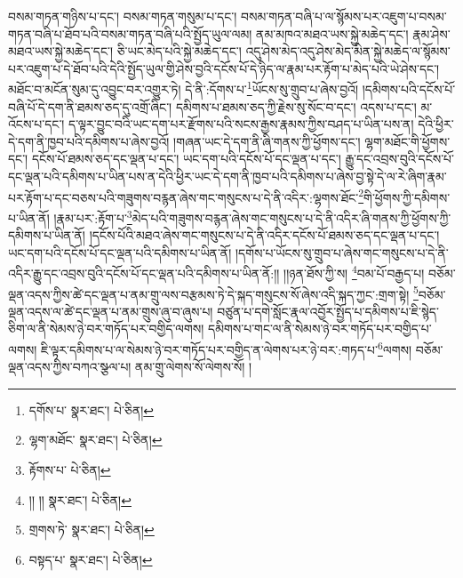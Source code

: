 བསམ་གཏན་གཉིས་པ་དང་། བསམ་གཏན་གསུམ་པ་དང་། བསམ་གཏན་བཞི་པ་ལ་སྙོམས་པར་འཇུག་པ་བསམ་གཏན་བཞི་པ་ཐོབ་པའི་བསམ་གཏན་བཞི་པའི་སྤྱོད་ཡུལ་ལམ། ནམ་མཁའ་མཐའ་ཡས་སྐྱེ་མཆེད་དང་། རྣམ་ཤེས་མཐའ་ཡས་སྐྱེ་མཆེད་དང་། ཅི་ཡང་མེད་པའི་སྐྱེ་མཆེད་དང་། འདུ་ཤེས་མེད་འདུ་ཤེས་མེད་མིན་སྐྱེ་མཆེད་ལ་སྙོམས་པར་འཇུག་པ་དེ་ཐོབ་པའི་དེའི་སྤྱོད་ཡུལ་གྱི་ཤེས་བྱའི་དངོས་པོ་དེ་ཉིད་ལ་རྣམ་པར་རྟོག་པ་མེད་པའི་ཡེ་ཤེས་དང་། མཐོང་བ་མངོན་སུམ་དུ་འབྱུང་བར་འགྱུར་ཏེ། དེ་ནི་:དོགས་པ་\footnote{དགོས་པ་  སྣར་ཐང་།  པེ་ཅིན། }ཡོངས་སུ་གྲུབ་པ་ཞེས་བྱའོ། །དམིགས་པའི་དངོས་པོ་བཞི་པོ་དེ་དག་ནི་ཐམས་ཅད་དུ་འགྲོ་ཞིང་། དམིགས་པ་ཐམས་ཅད་ཀྱི་རྗེས་སུ་སོང་བ་དང་། འདས་པ་དང་། མ་འོངས་པ་དང་། ད་ལྟར་བྱུང་བའི་ཡང་དག་པར་རྫོགས་པའི་སངས་རྒྱས་རྣམས་ཀྱིས་བཤད་པ་ཡིན་པས་ན། དེའི་ཕྱིར་དེ་དག་ནི་ཁྱབ་པའི་དམིགས་པ་ཞེས་བྱའོ། །གཞན་ཡང་དེ་དག་ནི་ཞི་གནས་ཀྱི་ཕྱོགས་དང་། ལྷག་མཐོང་གི་ཕྱོགས་དང་། དངོས་པོ་ཐམས་ཅད་དང་ལྡན་པ་དང་། ཡང་དག་པའི་དངོས་པོ་དང་ལྡན་པ་དང་། རྒྱུ་དང་འབྲས་བུའི་དངོས་པོ་དང་ལྡན་པའི་དམིགས་པ་ཡིན་པས་ན་དེའི་ཕྱིར་ཡང་དེ་དག་ནི་ཁྱབ་པའི་དམིགས་པ་ཞེས་བྱ་སྟེ་དེ་ལ་རེ་ཞིག་རྣམ་པར་རྟོག་པ་དང་བཅས་པའི་གཟུགས་བརྙན་ཞེས་གང་གསུངས་པ་དེ་ནི་འདིར་:ལྷགས་ཐོང་\footnote{ལྷག་མཐོང་  སྣར་ཐང་།  པེ་ཅིན། }གི་ཕྱོགས་ཀྱི་དམིགས་པ་ཡིན་ནོ། །རྣམ་པར་:རྟོག་པ་\footnote{རྟོགས་པ་  པེ་ཅིན། }མེད་པའི་གཟུགས་བརྙན་ཞེས་གང་གསུངས་པ་དེ་ནི་འདིར་ཞི་གནས་ཀྱི་ཕྱོགས་ཀྱི་དམིགས་པ་ཡིན་ནོ། །དངོས་པོའི་མཐའ་ཞེས་གང་གསུངས་པ་དེ་ནི་འདིར་དངོས་པོ་ཐམས་ཅད་དང་ལྡན་པ་དང་། ཡང་དག་པའི་དངོས་པོ་དང་ལྡན་པའི་དམིགས་པ་ཡིན་ནོ། །དགོས་པ་ཡོངས་སུ་གྲུབ་པ་ཞེས་གང་གསུངས་པ་དེ་ནི་འདིར་རྒྱུ་དང་འབྲས་བུའི་དངོས་པོ་དང་ལྡན་པའི་དམིགས་པ་ཡིན་ནོ:།། །།ཉན་ཐོས་ཀྱི་ས། \footnote{།། །།   སྣར་ཐང་།  པེ་ཅིན། }བམ་པོ་བརྒྱད་པ། བཅོམ་ལྡན་འདས་ཀྱིས་ཚེ་དང་ལྡན་པ་ནམ་གྲུ་ལས་བརྩམས་ཏེ་དེ་སྐད་གསུངས་སོ་ཞེས་འདི་སྐད་ཀྱང་:གྲག་སྟེ། \footnote{གྲགས་ཏེ་  སྣར་ཐང་།  པེ་ཅིན། }བཅོམ་ལྡན་འདས་ལ་ཚེ་དང་ལྡན་པ་ནམ་གྲུས་ཞུ་བ་ཞུས་པ། བཙུན་པ་དགེ་སློང་རྣལ་འབྱོར་སྤྱོད་པ་དམིགས་པ་ཇི་སྙེད་ཅིག་ལ་ནི་སེམས་ཉེ་བར་གཏོད་པར་བགྱིད་ལགས། དམིགས་པ་གང་ལ་ནི་སེམས་ཉེ་བར་གཏོད་པར་བགྱིད་པ་ལགས། ཇི་ལྟར་དམིགས་པ་ལ་སེམས་ཉེ་བར་གཏོད་པར་བགྱིད་ན་ལེགས་པར་ཉེ་བར་:གཏད་པ་\footnote{བསྟད་པ་  སྣར་ཐང་།  པེ་ཅིན། }ལགས། བཅོམ་ལྡན་འདས་ཀྱིས་བཀའ་སྩལ་པ། ནམ་གྲུ་ལེགས་སོ་ལེགས་སོ། །
